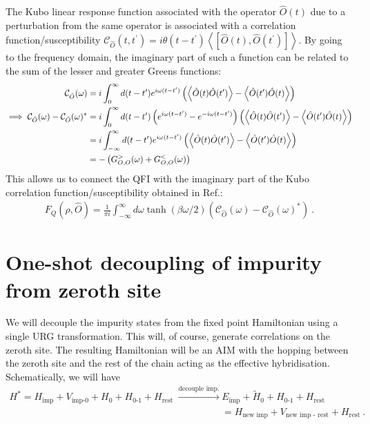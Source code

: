 \documentclass{iopart}
\begin{document}
The Kubo linear response function associated with the operator \(\hat O(t)\) due to a perturbation from the same operator is associated with a correlation function/susceptibility \(\mathcal{C}_{\hat O}(t,t^\prime) = i\theta(t - t^\prime)\left< \left[\hat O(t), \hat O(t^\prime)\right] \right>\). By going to the frequency domain, the imaginary part of such a function can be related to the sum of the lesser and greater Greens functions:
\begin{eqnarray}
	\hspace*{2.2cm} \mathcal{C}_{\hat O}(\omega) &= i\int_0^\infty d(t-t^\prime) e^{i\omega(t-t^\prime)}\left( \left<\hat O(t) \hat O(t^\prime) \right> - \left<\hat O(t^\prime) \hat O(t) \right>\right)\nonumber \\
	\implies \mathcal{C}_{\hat O}(\omega) - \mathcal{C}_{\hat O}(\omega)^* &= i\int_0^\infty d(t-t^\prime)\left( e^{i\omega(t-t^\prime)}-e^{-i\omega(t-t^\prime)} \right)\left( \left<\hat O(t) \hat O(t^\prime) \right> - \left<\hat O(t^\prime) \hat O(t) \right>\right)\nonumber\\
						&= i\int_{-\infty}^{\infty}d(t-t^\prime) e^{i\omega(t-t^\prime)} \left( \left<\hat O(t) \hat O(t^\prime) \right> - \left<\hat O(t^\prime) \hat O(t) \right>\right)\nonumber \\
						&= -\left( G^>_{O,O}(\omega) + G^<_{O,O}(\omega) \right) 
\end{eqnarray}
This allows us to connect the QFI with the imaginary part of the Kubo correlation function/susceptibility obtained in Ref.\cite{Hauke2016}:
\begin{eqnarray}
F_Q(\rho, \hat O) = \frac{1}{\pi i}\int_{-\infty}^\infty d\omega \tanh \left( \beta \omega/2 \right)\left(\mathcal{C}_{\hat O}(\omega) - \mathcal{C}_{\hat O}(\omega)^*\right) ~.
\end{eqnarray}



\section{One-shot decoupling of impurity from zeroth site}
\label{app-imp-remove}
We will decouple the impurity states from the fixed point Hamiltonian using a single URG transformation. This will, of course, generate correlations on the zeroth site. The resulting Hamiltonian will be an AIM with the hopping between the zeroth site and the rest of the chain acting as the effective hybridisation. Schematically, we will have
\begin{eqnarray}
	H^* = H_\text{imp} + V_\text{imp-0} + H_\text{0} + H_\text{0-1} + H_\text{rest} ~ {\xrightarrow{\text{decouple imp.}}} & E_\text{imp} + \tilde H_\text{0} + H_\text{0-1} + H_\text{rest} \nonumber\\
															       &= H_\text{new imp} + V_\text{new imp - rest} + H_\text{rest}~.
\end{eqnarray}
\end{document}
